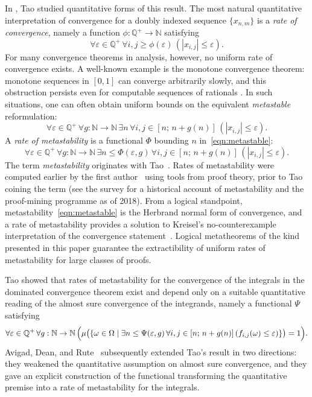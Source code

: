 \documentclass[11pt]{amsart}
\theoremstyle{definition}
\theoremstyle{remark}
\def\NN{\mathbb{N}}
\def\QQ{\mathbb{Q}}
\begin{document}
In \cite{tao:08:ergodic}, Tao studied quantitative forms of this result. The
most natural quantitative interpretation of convergence for a doubly indexed
sequence $\{x_{n,m}\}$ is a \emph{rate of convergence}, namely a function
$\phi:\QQ^+\to\NN$ satisfying
\[
  \forall \varepsilon \in \QQ^+\,\forall i,j \ge \phi(\varepsilon)\,(|x_{i,j}| \le \varepsilon).
\]
For many convergence theorems in analysis, however, no uniform rate of
convergence exists. A well-known example is the monotone convergence theorem:
monotone sequences in $[0,1]$ can converge arbitrarily slowly, and this
obstruction persists even for computable sequences of rationals
\cite{specker:49:sequence}. In such situations, one can often obtain uniform bounds on the equivalent
\emph{metastable} reformulation:
\begin{equation}
\label{eqn:metastable}
  \forall \varepsilon \in \QQ^+\,\forall g:\NN\to\NN\,\exists n\,
  \forall i,j\in[n;\,n+g(n)]\,(|x_{i,j}|\le\varepsilon).
\end{equation}
A \emph{rate of metastability} is a functional $\Phi$ bounding $n$
in~\eqref{eqn:metastable}:
\[
  \forall \varepsilon \in \QQ^+\,\forall g:\NN\to\NN\,\exists n \le \Phi(\varepsilon,g)\,
  \forall i,j\in[n;\,n+g(n)]\,(|x_{i,j}|\le\varepsilon).
\]
The term \emph{metastability} originates with Tao~\cite{tao:07:softanalysis}.
Rates of metastability were computed earlier by the first
author~\cite{kohlenbach:meta:first,kohlenbach2004bounds} using tools from
proof theory, prior to Tao coining the term (see the survey
\cite{kohlenbach:19:nonlinear:icm} for a historical account of metastability
and the proof-mining programme as of 2018). From a logical standpoint,
metastability~\eqref{eqn:metastable} is the Herbrand normal form of
convergence, and a rate of metastability provides a solution to
Kreisel's no-counterexample interpretation of the convergence
statement~\cite{kreisel:51:proofinterpretation:part1,
kreisel:52:proofinterpretation:part2}. Logical metatheorems of the kind
presented in this paper guarantee the extractibility of uniform rates of
metastability for large classes of proofs.

Tao showed that rates of metastability for the convergence of the integrals
in the dominated convergence theorem exist and depend only on a suitable
quantitative reading of the almost sure convergence of the integrands, namely
a functional $\Psi$ satisfying
\[
  \forall \varepsilon \in \QQ^+\,\forall g:\NN\to\NN\,
  \Bigl(\mu\bigl(\{\omega\in\Omega\mid \exists n \le \Psi(\varepsilon,g)\,
  \forall i,j\in[n;\,n+g(n)]\,(f_{i,j}(\omega)\le\varepsilon)\}\bigr)=1\Bigr).
\]
Avigad, Dean, and Rute~\cite{Avigad-Dean-Rute:Dominated:12} subsequently
extended Tao's result in two directions: they weakened the quantitative
assumption on almost sure convergence, and they gave an explicit construction
of the functional transforming the quantitative premise into a rate of
metastability for the integrals.
\end{document}
